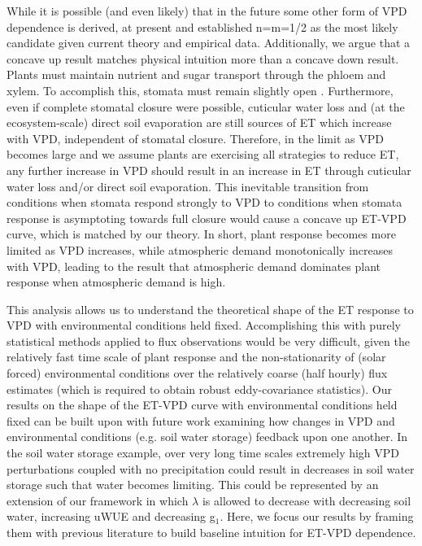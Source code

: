 \documentclass[12pt]{article}
\begin{document}
While it is possible (and even likely) that in the future some other
form of VPD dependence is derived, at present \cite{MEDLYN_2011} and
\cite{Zhou_2014} established n=m=1/2 as the most likely candidate
given current theory and empirical data. Additionally, we argue that a
concave up result matches physical intuition more than a concave down
result. Plants must maintain nutrient and sugar transport through the
phloem and xylem. To accomplish this, stomata must remain slightly
open \cite{De_2013, Nikinmaa_2013, Ryan_2014}. Furthermore, even if
complete stomatal closure were possible, cuticular water loss and (at
the ecosystem-scale) direct soil evaporation are still sources of ET
which increase with VPD, independent of stomatal closure. Therefore,
in the limit as VPD becomes large and we assume plants are exercising
all strategies to reduce ET, any further increase in VPD should result
in an increase in ET through cuticular water loss and/or direct soil
evaporation. This inevitable transition from conditions when stomata
respond strongly to VPD to conditions when stomata response is
asymptoting towards full closure would cause a concave up ET-VPD
curve, which is matched by our theory. In short, plant response
becomes more limited as VPD increases, while atmospheric demand
monotonically increases with VPD, leading to the result that
atmospheric demand dominates plant response when atmospheric demand is
high.

This analysis allows us to understand the theoretical shape of the ET
response to VPD with environmental conditions held
fixed. Accomplishing this with purely statistical methods applied to
flux observations would be very difficult, given the relatively fast
time scale of plant response and the non-stationarity of (solar
forced) environmental conditions over the relatively coarse (half
hourly) flux estimates (which is required to obtain robust
eddy-covariance statistics). Our results on the shape of the ET-VPD
curve with environmental conditions held fixed can be built upon with
future work examining how changes in VPD and environmental conditions
(e.g. soil water storage) feedback upon one another. In the soil water
storage example, over very long time scales extremely high VPD
perturbations coupled with no precipitation could result in decreases
in soil water storage such that water becomes limiting. This could be
represented by an extension of our framework in which $\lambda$ is
allowed to decrease with decreasing soil water, increasing uWUE and
decreasing g$_1$. Here, we focus our results by framing them with
previous literature to build baseline intuition for ET-VPD dependence.
\end{document}
